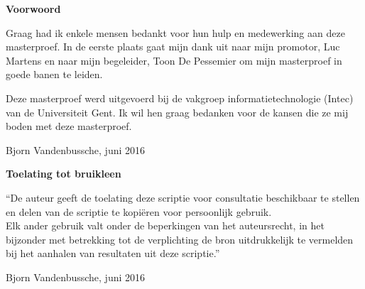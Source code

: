 
\newpage

\noindent \textbf{\huge Voorwoord}

\vspace{1.5cm}

\noindent
Graag had ik enkele mensen bedankt voor hun hulp en medewerking aan deze masterproef. In de eerste plaats gaat mijn dank uit naar mijn promotor, Luc Martens en naar mijn begeleider, Toon De Pessemier om mijn masterproef in goede banen te leiden. 

Deze masterproef werd uitgevoerd bij de vakgroep informatietechnologie (Intec) van de Universiteit Gent. Ik wil hen graag bedanken voor de kansen die ze mij boden met deze masterproef. 



\addvspace{4cm}

\noindent Bjorn Vandenbussche, juni 2016\newpage

\noindent \textbf{\huge Toelating tot bruikleen}

\vspace{1.5cm}

\noindent
``De auteur geeft de toelating deze scriptie voor consultatie beschikbaar
te stellen en delen van de scriptie te kopi\"eren voor persoonlijk
gebruik.\\
Elk ander gebruik valt onder de beperkingen van het auteursrecht,
in het bijzonder met betrekking tot de verplichting de bron uitdrukkelijk
te vermelden bij het aanhalen van resultaten uit deze scriptie.''

\addvspace{4cm}

\noindent Bjorn Vandenbussche, juni 2016
